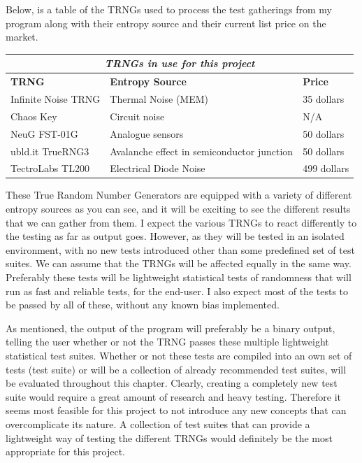 \documentclass[]{final_report}
\begin{document}
\par{Below, is a table of the TRNGs used to process the test gatherings from my program along with their entropy source and their current list price on the market.}

\begin{tabular}{ |p{6cm}||p{4cm}|p{4cm}|  }
 \hline
 \multicolumn{3}{|c|}{\textbf{\textit{TRNGs in use for this project}}} \\
 \hline
 \textbf{TRNG}& \textbf{Entropy Source} &\textbf{Price}\\
 \hline
 Infinite Noise TRNG  & Thermal Noise (MEM) & 35 dollars\\ 
 \hline
 Chaos Key & Circuit noise & N/A \\
 \hline
 NeuG FST-01G & Analogue sensors & 50 dollars\\
 \hline
 ubld.it TrueRNG3 & Avalanche effect in semiconductor junction & 50 dollars\\
 \hline
 TectroLabs TL200 & Electrical Diode Noise & 499 dollars\\
 \hline
\end{tabular}

\par{These True Random Number Generators are equipped with a variety of different entropy sources as you can see, and it will be exciting to see the different results that we can gather from them. I expect the various TRNGs to react differently to the testing as far as output goes. However, as they will be tested in an isolated environment, with no new tests introduced other than some predefined set of test suites. We can assume that the TRNGs will be affected equally in the same way. Preferably these tests will be lightweight statistical tests of randomness that will run as fast and reliable tests, for the end-user. I also expect most of the tests to be passed by all of these, without any known bias implemented.}

\par{As mentioned, the output of the program will preferably be a binary output, telling the user whether or not the TRNG passes these multiple lightweight statistical test suites. Whether or not these tests are compiled into an own set of tests (test suite) or will be a collection of already recommended test suites, will be evaluated throughout this chapter. Clearly, creating a completely new test suite would require a great amount of research and heavy testing. Therefore it seems most feasible for this project to not introduce any new concepts that can overcomplicate its nature. A collection of test suites that can provide a lightweight way of testing the different TRNGs would definitely be the most appropriate for this project.}
\end{document}
